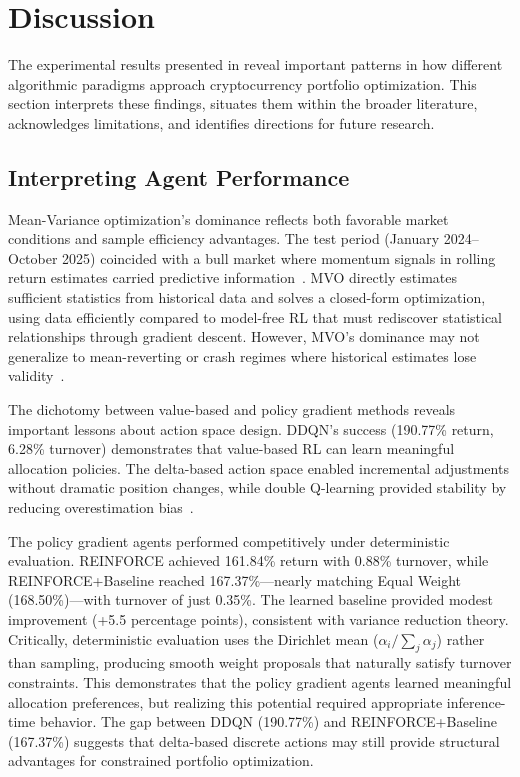 
\section{Discussion}
\label{sec:discussion}

The experimental results presented in  reveal important patterns in how different algorithmic paradigms approach cryptocurrency portfolio optimization. This section interprets these findings, situates them within the broader literature, acknowledges limitations, and identifies directions for future research.

\subsection{Interpreting Agent Performance}
\label{sec:performance_analysis}

Mean-Variance optimization's dominance reflects both favorable market conditions and sample efficiency advantages. The test period (January 2024--October 2025) coincided with a bull market where momentum signals in rolling return estimates carried predictive information~\cite{jegadeesh1993momentum}. MVO directly estimates sufficient statistics from historical data and solves a closed-form optimization, using data efficiently compared to model-free RL that must rediscover statistical relationships through gradient descent. However, MVO's dominance may not generalize to mean-reverting or crash regimes where historical estimates lose validity~\cite{james2022correlations}.

The dichotomy between value-based and policy gradient methods reveals important lessons about action space design. DDQN's success (190.77\% return, 6.28\% turnover) demonstrates that value-based RL can learn meaningful allocation policies. The delta-based action space enabled incremental adjustments without dramatic position changes, while double Q-learning provided stability by reducing overestimation bias~\citep{vanHasselt2016ddqn}.

The policy gradient agents performed competitively under deterministic evaluation. REINFORCE achieved 161.84\% return with 0.88\% turnover, while REINFORCE+Baseline reached 167.37\%---nearly matching Equal Weight (168.50\%)---with turnover of just 0.35\%. The learned baseline provided modest improvement (+5.5 percentage points), consistent with variance reduction theory. Critically, deterministic evaluation uses the Dirichlet mean ($\alpha_i / \sum_j \alpha_j$) rather than sampling, producing smooth weight proposals that naturally satisfy turnover constraints. This demonstrates that the policy gradient agents learned meaningful allocation preferences, but realizing this potential required appropriate inference-time behavior. The gap between DDQN (190.77\%) and REINFORCE+Baseline (167.37\%) suggests that delta-based discrete actions may still provide structural advantages for constrained portfolio optimization.

